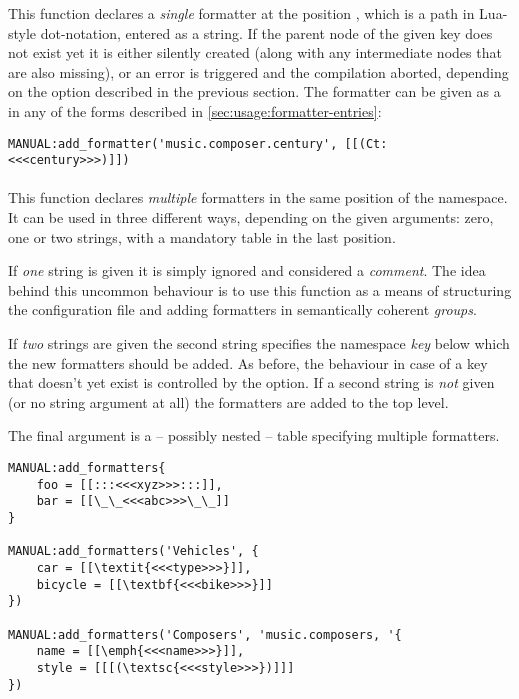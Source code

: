 \documentclass[12pt]{scrartcl}
\begin{document}
This function declares a \emph{single} formatter at the position ,
which is a path in Lua-style dot-notation, entered as a string.  If the parent
node of the given key does not exist yet it is either silently created (along
with any intermediate nodes that are also missing), or an error is triggered and
the compilation aborted, depending on the  option described in
the previous section. The formatter can be given as a  in
any of the forms described in \vref{sec:usage:formatter-entries}:

\begin{verbatim}
MANUAL:add_formatter('music.composer.century', [[(Ct: <<<century>>>)]])
\end{verbatim}

\paragraph{}

This function declares \emph{multiple} formatters in the same position of the namespace.  It can be used in three different ways, depending on the given arguments: zero, one or two strings, with a mandatory table in the last position.

If \emph{one} string is given it is simply ignored and considered a
\emph{comment}. The idea behind this uncommon behaviour is to use this function
as a means of structuring the configuration file and adding formatters in
semantically coherent \emph{groups}.

If \emph{two} strings are given the second string specifies the namespace \emph{key} below which the new formatters should be added.  As before, the behaviour in case of a key that doesn't yet exist is controlled by the  option.  If a second string is \emph{not} given (or no string argument at all) the formatters are added to the top level.

The final argument is a -- possibly nested -- table specifying multiple
formatters.

\begin{verbatim}
MANUAL:add_formatters{
	foo = [[:::<<<xyz>>>:::]],
	bar = [[\_\_<<<abc>>>\_\_]]
}

MANUAL:add_formatters('Vehicles', {
	car = [[\textit{<<<type>>>}]],
	bicycle = [[\textbf{<<<bike>>>}]]
})

MANUAL:add_formatters('Composers', 'music.composers, '{
	name = [[\emph{<<<name>>>}]],
	style = [[[(\textsc{<<<style>>>})]]]
})
\end{verbatim}
\end{document}
